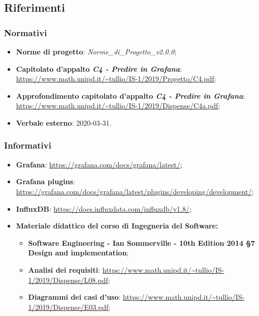 \subsection{Riferimenti}
		\subsubsection{Normativi}
			\begin{itemize}
				\item \textbf{Norme di progetto}: \emph{Norme\_di\_Progetto\_v2.0.0};
				\item \textbf{Capitolato d'appalto \emph{C4 - Predire in Grafana}}: \url{https://www.math.unipd.it/~tullio/IS-1/2019/Progetto/C4.pdf};
				\item \textbf{Approfondimento capitolato d'appalto \emph{C4 - Predire in Grafana}}: \url{https://www.math.unipd.it/~tullio/IS-1/2019/Dispense/C4a.pdf};
				\item \textbf{Verbale esterno}: 2020-03-31. 
			\end{itemize}
		
		\subsubsection{Informativi}
			\begin{itemize}
			\item \textbf{Grafana}: \url{https://grafana.com/docs/grafana/latest/};
			\item \textbf{Grafana plugins}: \url{https://grafana.com/docs/grafana/latest/plugins/developing/development/};
			\item \textbf{InfluxDB}: \url{https://docs.influxdata.com/influxdb/v1.8/};

			\item \textbf{Materiale didattico del corso di Ingegneria del Software:}
			\begin{itemize}
				\item \textbf{Software Engineering - Ian Sommerville - 10th Edition 2014 \S7 Design and implementation};
				\item \textbf{Analisi dei requisiti}: \url{https://www.math.unipd.it/~tullio/IS-1/2019/Dispense/L08.pdf};				\item \textbf{Diagrammi dei casi d'uso}: \url{https://www.math.unipd.it/~tullio/IS-1/2019/Dispense/E03.pdf};
					
				\end{itemize}
			\end{itemize}				